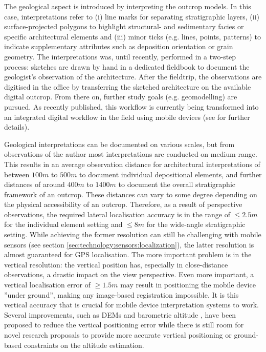 \documentclass[review]{elsarticle}
\begin{document}
The geological aspect is introduced by interpreting the outcrop models. In this case, interpretations refer to (i) line marks for separating stratigraphic layers, (ii) surface-projected polygons to highlight structural- and sedimentary facies or specific architectural elements and (iii) minor ticks (e.g. lines, points, patterns) to indicate supplementary attributes such as deposition orientation or grain geometry. The interpretations was, until recently, performed in a two-step process: sketches are drawn by hand in a dedicated fieldbook to document the geologist's observation of the architecture. After the fieldtrip, the observations are digitised in the office by transferring the sketched architecture on the available digital outcrop. From there on, further study goals (e.g. geomodelling) are pursued. As recently published, this workflow is currently being transformed into an integrated digital workflow in the field using mobile devices (see \cite{Kehl2018_AGU} for further details).

Geological interpretations can be documented on various scales, but from observations of the author most interpretations are conducted on medium-range. This results in an average observation distance for architectural interpretations of between $100m$ to $500m$ to document individual depositional elements, and further distances of around $400m$ to $1400m$ to document the overall stratigraphic framework of an outcrop. These distances can vary to some degree depending on the physical accessibility of an outcrop. Therefore, as a result of perspective observations, the required lateral localisation accuracy is in the range of $\leq 2.5m$ for the individual element setting and $\leq 8m$ for the wide-angle stratigraphic setting. While achieving the former resolution can still be challenging with mobile sensors (see section \ref{sec:technology:sensors:localization}), the latter resolution is almost guaranteed for \gls{GPS} localisation. The more important problem is in the vertical resolution: the vertical position has, especially in close-distance observations, a drastic impact on the view perspective. Even more important, a vertical localisation error of  $\geq 1.5m$ may result in positioning the mobile device ''under ground'', making any image-based registration impossible. It is this vertical accuracy that is crucial for mobile device interpretation systems to work. Several improvements, such as \glspl{DEM} and barometric altitude \cite{Kehl2017_VGC}, have been proposed to reduce the vertical positioning error while there is still room for novel research proposals to provide more accurate vertical positioning or ground-based constraints on the altitude estimation.
\end{document}
